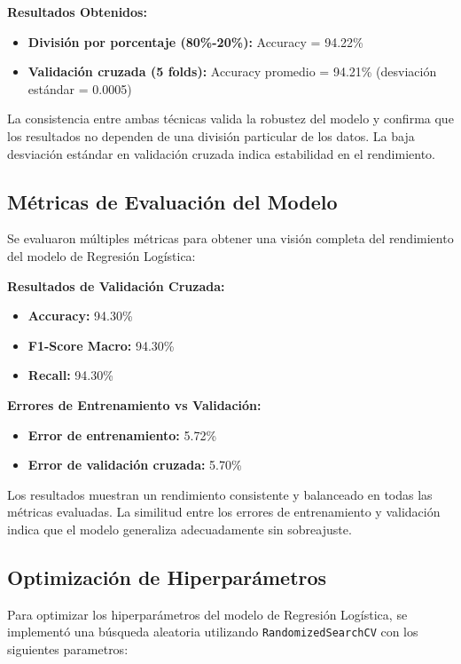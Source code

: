 \documentclass{article}
\begin{document}
\textbf{Resultados Obtenidos:}
\begin{itemize}
    \item \textbf{División por porcentaje (80\%-20\%):} Accuracy = 94.22\%
    \item \textbf{Validación cruzada (5 folds):} Accuracy promedio = 94.21\% (desviación estándar = 0.0005)
\end{itemize}

La consistencia entre ambas técnicas valida la robustez del modelo y confirma que los resultados no dependen de una división particular de los datos. La baja desviación estándar en validación cruzada indica estabilidad en el rendimiento.

\subsection{Métricas de Evaluación del Modelo}

Se evaluaron múltiples métricas para obtener una visión completa del rendimiento del modelo de Regresión Logística:

\textbf{Resultados de Validación Cruzada:}
\begin{itemize}
    \item \textbf{Accuracy:} 94.30\%
    \item \textbf{F1-Score Macro:} 94.30\%
    \item \textbf{Recall:} 94.30\%
\end{itemize}

\textbf{Errores de Entrenamiento vs Validación:}
\begin{itemize}
    \item \textbf{Error de entrenamiento:} 5.72\%
    \item \textbf{Error de validación cruzada:} 5.70\%
\end{itemize}

Los resultados muestran un rendimiento consistente y balanceado en todas las métricas evaluadas. La similitud entre los errores de entrenamiento y validación indica que el modelo generaliza adecuadamente sin sobreajuste.

\subsection{Optimización de Hiperparámetros}

Para optimizar los hiperparámetros del modelo de Regresión Logística, se implementó una búsqueda aleatoria utilizando \texttt{RandomizedSearchCV} con los siguientes parametros:
\end{document}

